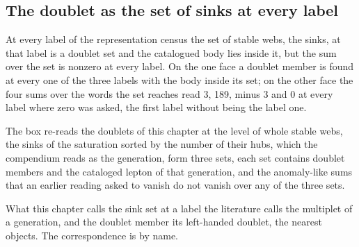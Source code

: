 \subsection{The doublet as the set of sinks at every label}\label{mod:VI-3-D538842-w-dbcl}
\begin{chwall}\label{box:VI-3-D538842-w-dbcl:1}
At every label of the representation census the set of stable webs, the sinks, at that label is a doublet set and the catalogued body lies inside it, but the sum over the set is nonzero at every label. On the one face a doublet member is found at every one of the three labels with the body inside its set; on the other face the four sums over the words the set reaches read 3, 189, minus 3 and 0 at every label where zero was asked, the first label without being the label one.
\end{chwall}
The box re-reads the doublets of this chapter at the level of whole stable webs, the sinks of the saturation sorted by the number of their hubs, which the compendium reads as the generation, form three sets, each set contains doublet members and the cataloged lepton of that generation, and the anomaly-like sums that an earlier reading asked to vanish do not vanish over any of the three sets.
\begin{chbridge}
What this chapter calls the sink set at a label the literature calls the multiplet of a generation, and the doublet member its left-handed doublet, the nearest objects. The correspondence is by name.
\end{chbridge}
